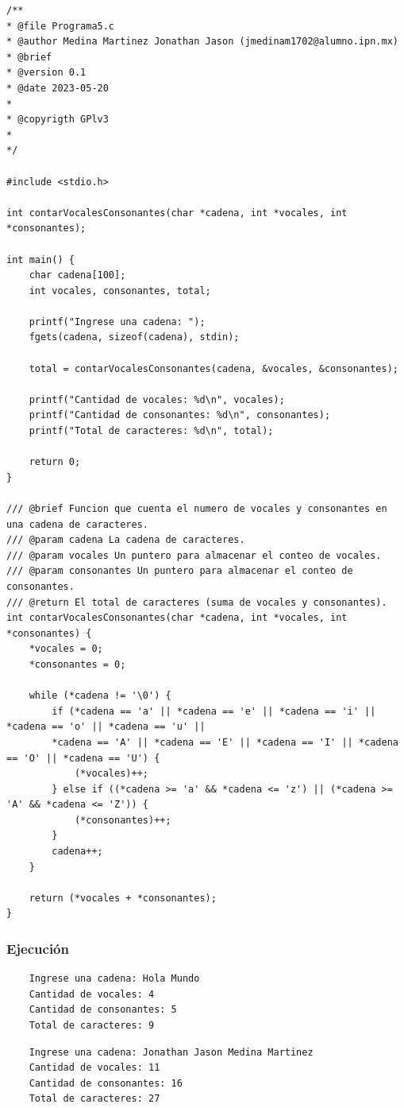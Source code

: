 \documentclass{article}
\begin{document}
	\begin{lstlisting}
/**
* @file Programa5.c
* @author Medina Martinez Jonathan Jason (jmedinam1702@alumno.ipn.mx)
* @brief 
* @version 0.1
* @date 2023-05-20
* 
* @copyrigth GPlv3
* 
*/

#include <stdio.h>

int contarVocalesConsonantes(char *cadena, int *vocales, int *consonantes);

int main() {
	char cadena[100];
	int vocales, consonantes, total;
	
	printf("Ingrese una cadena: ");
	fgets(cadena, sizeof(cadena), stdin);
	
	total = contarVocalesConsonantes(cadena, &vocales, &consonantes);
	
	printf("Cantidad de vocales: %d\n", vocales);
	printf("Cantidad de consonantes: %d\n", consonantes);
	printf("Total de caracteres: %d\n", total);
	
	return 0;
}

/// @brief Funcion que cuenta el numero de vocales y consonantes en una cadena de caracteres.
/// @param cadena La cadena de caracteres.
/// @param vocales Un puntero para almacenar el conteo de vocales.
/// @param consonantes Un puntero para almacenar el conteo de consonantes.
/// @return El total de caracteres (suma de vocales y consonantes).
int contarVocalesConsonantes(char *cadena, int *vocales, int *consonantes) {
	*vocales = 0;
	*consonantes = 0;
	
	while (*cadena != '\0') {
		if (*cadena == 'a' || *cadena == 'e' || *cadena == 'i' || *cadena == 'o' || *cadena == 'u' ||
		*cadena == 'A' || *cadena == 'E' || *cadena == 'I' || *cadena == 'O' || *cadena == 'U') {
			(*vocales)++;
		} else if ((*cadena >= 'a' && *cadena <= 'z') || (*cadena >= 'A' && *cadena <= 'Z')) {
			(*consonantes)++;
		}
		cadena++;
	}
	
	return (*vocales + *consonantes);
}
	\end{lstlisting}
	
	\subsubsection{Ejecución}
	
	\begin{lstlisting}
	Ingrese una cadena: Hola Mundo
	Cantidad de vocales: 4
	Cantidad de consonantes: 5
	Total de caracteres: 9
	\end{lstlisting}
	
	\begin{lstlisting}
	Ingrese una cadena: Jonathan Jason Medina Martinez
	Cantidad de vocales: 11
	Cantidad de consonantes: 16
	Total de caracteres: 27
	\end{lstlisting}
	
\end{document}
